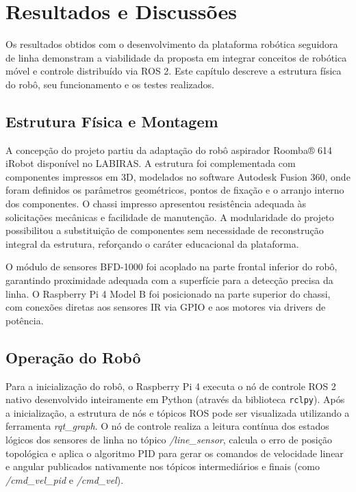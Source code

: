 \chapter{Resultados e Discussões}

Os resultados obtidos com o desenvolvimento da plataforma robótica seguidora de linha demonstram a viabilidade da proposta em integrar conceitos de robótica móvel e controle distribuído via ROS 2. Este capítulo descreve a estrutura física do robô, seu funcionamento e os testes realizados.


\section{Estrutura Física e Montagem}

A concepção do projeto partiu da adaptação do robô aspirador Roomba® 614 iRobot disponível no LABIRAS. A estrutura foi complementada com componentes impressos em 3D, modelados no software Autodesk Fusion 360, onde foram definidos os parâmetros geométricos, pontos de fixação e o arranjo interno dos componentes. O chassi impresso apresentou resistência adequada às solicitações mecânicas e facilidade de manutenção. A modularidade do projeto possibilitou a substituição de componentes sem necessidade de reconstrução integral da estrutura, reforçando o caráter educacional da plataforma.

O módulo de sensores BFD-1000 foi acoplado na parte frontal inferior do robô, garantindo proximidade adequada com a superfície para a detecção precisa da linha. O Raspberry Pi 4 Model B foi posicionado na parte superior do chassi, com conexões diretas aos sensores IR via GPIO e aos motores via drivers de potência.


\section{Operação do Robô}

Para a inicialização do robô, o Raspberry Pi 4 executa o nó de controle ROS 2 nativo desenvolvido inteiramente em Python (através da biblioteca \texttt{rclpy}). Após a inicialização, a estrutura de nós e tópicos ROS pode ser visualizada utilizando a ferramenta \textit{rqt\_graph}. O nó de controle realiza a leitura contínua dos estados lógicos dos sensores de linha no tópico \textit{/line\_sensor}, calcula o erro de posição topológica e aplica o algoritmo PID para gerar os comandos de velocidade linear e angular publicados nativamente nos tópicos intermediários e finais (como \textit{/cmd\_vel\_pid} e \textit{/cmd\_vel}).


